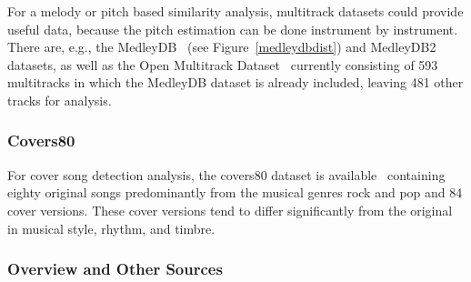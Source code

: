 For a melody or pitch based similarity analysis, multitrack datasets could provide useful data, because the pitch estimation can be done instrument by instrument. There are, e.g., the MedleyDB~\cite{medleydb1} (see Figure~\ref{medleydbdist}) and MedleyDB2~\cite{medleydb2} datasets, as well as the Open Multitrack Dataset~\cite{openmult1} currently consisting of 593 multitracks in which the MedleyDB dataset is already included, leaving 481 other tracks for analysis.

\subsubsection{Covers80}\label{cov801}

For cover song detection analysis, the covers80 dataset is available~\cite{cover80} containing eighty original songs predominantly from the musical genres rock and pop and 84 cover versions. These cover versions tend to differ significantly from the original in musical style, rhythm, and timbre.

\subsubsection{Overview and Other Sources}

